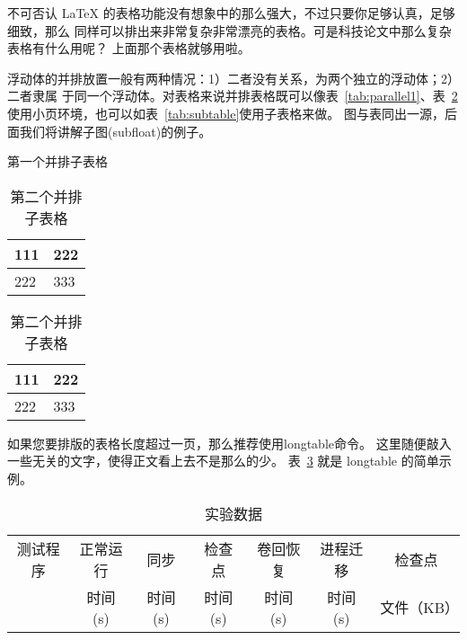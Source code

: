 {不可否认 \LaTeX{} 的表格功能没有想象中的那么强大，不过只要你足够认真，足够细致，那么
同样可以排出来非常复杂非常漂亮的表格。可是科技论文中那么复杂表格有什么用呢？
上面那个表格就够用啦。

浮动体的并排放置一般有两种情况：1）二者没有关系，为两个独立的浮动体；2）二者隶属
于同一个浮动体。对表格来说并排表格既可以像表~\ref{tab:parallel1}、表~\ref{tab:parallel2} 
使用小页环境，也可以如表~\ref{tab:subtable}使用子表格来做。
图与表同出一源，后面我们将讲解子图(subfloat)的例子。
\begin{table}[htb]
\centering
\noindent\begin{minipage}{0.45\textwidth}
\centering
\caption{第一个并排子表格}
\label{tab:parallel1}
\begin{tabular}{p{2cm}p{2cm}}
\toprule[1.5pt]
111 & 222 \\\midrule[1pt]
222 & 333 \\\bottomrule[1.5pt]
\end{tabular}
\end{minipage}
\begin{minipage}{0.45\textwidth}
\centering
\caption{第二个并排子表格}
\label{tab:parallel2}
\begin{tabular}{p{2cm}p{2cm}}
\toprule[1.5pt]
111 & 222 \\\midrule[1pt]
222 & 333 \\\bottomrule[1.5pt]
\end{tabular}
\end{minipage}
\end{table}
\begin{table}[htbp]
\centering
\caption{并排子表格}
\label{tab:subtable}
\hskip2cm
\end{table}

如果您要排版的表格长度超过一页，那么推荐使用\textsf{longtable}命令。
这里随便敲入一些无关的文字，使得正文看上去不是那么的少。
表~\ref{tab:performance} 就是 \textsf{longtable} 的简单示例。
\begin{longtable}[c]{c*{6}{r}}
\caption{实验数据}\label{tab:performance}\\
\toprule[1.5pt]
 测试程序 & \multicolumn{1}{c}{正常运行} & \multicolumn{1}{c}{同步}
& \multicolumn{1}{c}{检查点}   & \multicolumn{1}{c}{卷回恢复}
& \multicolumn{1}{c}{进程迁移} & \multicolumn{1}{c}{检查点} 	\\
& \multicolumn{1}{c}{时间 (s)} & \multicolumn{1}{c}{时间 (s)}
& \multicolumn{1}{c}{时间 (s)} & \multicolumn{1}{c}{时间 (s)}
& \multicolumn{1}{c}{时间 (s)} &  文件（KB）			\\
\midrule[1pt]%
\endfirsthead%


\end{longtable}}
